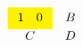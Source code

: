 \documentclass{article}
\begin{document}
\[ \begin{array}{cc}
\colorbox{yellow}{$\begin{array}{cc}1 &0\end{array}$} & B\\
C & D
\end{array} \]
\end{document}
